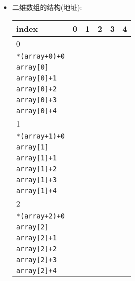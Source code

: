\documentclass[a4paper,UTF8]{ctexart}
\begin{document}
\begin{itemize}[leftmargin=0pt, rightmargin=0cm, labelwidth=0.8cm, labelsep=0.2cm]
\begin{lstlisting}
   {10, 11, 12, 13, 14}   /*  initializers for row indexed by 2 */
};
// equivalent to
int a[3][5] = {0,1,2,3,4,5,6,7,8,9,10,11,12,13,14};
int a[3][5] = {  
   {0, 1, 2} ,            /*  rest unspecified elements are 0 */
   {5, 6, 7, 8, 9} ,
   {10, 11, 12, 13}       /*  rest unspecified elements are 0 */
};
\end{lstlisting}
\item 二维数组的结构(地址):
  \vspace{-5pt}
  \begin{center}
  \begin{tabularx}{\textwidth}{| l | X | X | X | X | X |}
  \hline
   index & 0 & 1 & 2 & 3 & 4 \\ \hline
   0 & \makecell[l]{\lstinline$array+0$ \\ \lstinline$*(array+0)+0$ \\ \lstinline$array[0]$} &
   \makecell[l]{\lstinline$*(array+0)+1$ \\ \lstinline$array[0]+1$} &
   \makecell[l]{\lstinline$*(array+0)+2$ \\ \lstinline$array[0]+2$} &
   \makecell[l]{\lstinline$*(array+0)+3$ \\ \lstinline$array[0]+3$} &
   \makecell[l]{\lstinline$*(array+0)+4$ \\ \lstinline$array[0]+4$} \\ \hline
   1 & \makecell[l]{\lstinline$array+1$ \\ \lstinline$*(array+1)+0$ \\ \lstinline$array[1]$} &
   \makecell[l]{\lstinline$*(array+1)+1$ \\ \lstinline$array[1]+1$} &
   \makecell[l]{\lstinline$*(array+1)+2$ \\ \lstinline$array[1]+2$} &
   \makecell[l]{\lstinline$*(array+1)+3$ \\ \lstinline$array[1]+3$} &
   \makecell[l]{\lstinline$*(array+1)+4$ \\ \lstinline$array[1]+4$} \\ \hline
   2 & \makecell[l]{\lstinline$array+2$ \\ \lstinline$*(array+2)+0$ \\ \lstinline$array[2]$} &
   \makecell[l]{\lstinline$*(array+2)+1$ \\ \lstinline$array[2]+1$} &
   \makecell[l]{\lstinline$*(array+2)+2$ \\ \lstinline$array[2]+2$} &
   \makecell[l]{\lstinline$*(array+2)+3$ \\ \lstinline$array[2]+3$} &
   \makecell[l]{\lstinline$*(array+2)+4$ \\ \lstinline$array[2]+4$} \\ \hline
  \end{tabularx}
  \end{center}
  \vspace{-5pt}
\end{itemize}
\end{document}
